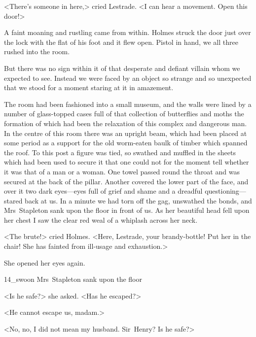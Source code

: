 <There's someone in here,> cried Lestrade. <I can hear a movement. Open this door!>

A faint moaning and rustling came from within. Holmes struck the door just over the lock with the flat of his foot and it flew open. Pistol in hand, we all three rushed into the room.

But there was no sign within it of that desperate and defiant villain whom we expected to see. Instead we were faced by an object so strange and so unexpected that we stood for a moment staring at it in amazement.

The room had been fashioned into a small museum, and the walls were lined by a number of glass-topped cases full of that collection of butterflies and moths the formation of which had been the relaxation of this complex and dangerous man. In the centre of this room there was an upright beam, which had been placed at some period as a support for the old worm-eaten baulk of timber which spanned the roof. To this post a figure was tied, so swathed and muffled in the sheets which had been used to secure it that one could not for the moment tell whether it was that of a man or a woman. One towel passed round the throat and was secured at the back of the pillar. Another covered the lower part of the face, and over it two dark eyes—eyes full of grief and shame and a dreadful questioning—stared back at us. In a minute we had torn off the gag, unswathed the bonds, and Mrs~Stapleton sank upon the floor in front of us. As her beautiful head fell upon her chest I saw the clear red weal of a whiplash across her neck.

<The brute!> cried Holmes. <Here, Lestrade, your brandy-bottle! Put her in the chair! She has fainted from ill-usage and exhaustion.>

She opened her eyes again.


	\begin{bwbigpic}
			[1.0]  
		{14_swoon}
		{Mrs~Stapleton sank upon the floor}
	\end{bwbigpic}

<Is he safe?> she asked. <Has he escaped?>

<He cannot escape us, madam.>

<No, no, I did not mean my husband. Sir~Henry? Is he safe?>

